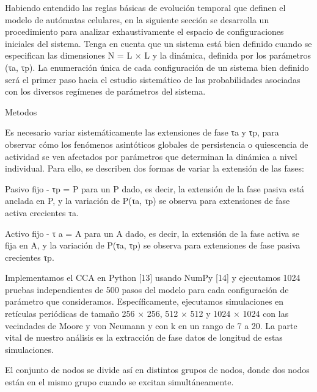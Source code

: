 Habiendo entendido las reglas básicas de evolución temporal que definen el modelo de autómatas celulares, en la siguiente sección se desarrolla un procedimiento para analizar exhaustivamente el espacio de configuraciones iniciales del sistema. Tenga en cuenta que un sistema está bien definido cuando se especifican las dimensiones N = L × L y la dinámica, definida por los parámetros (τa, τp). La enumeración única de cada configuración de un sistema bien definido será el primer paso hacia el estudio sistemático de las probabilidades asociadas con los diversos regímenes de parámetros del sistema.

Metodos

Es necesario variar sistemáticamente las extensiones de fase τa y τp, para observar cómo los fenómenos asintóticos globales de persistencia o quiescencia de actividad se ven afectados por parámetros que determinan la dinámica a nivel individual. Para ello, se describen dos formas de variar la extensión de las fases:

Pasivo fijo - τp = P para un P dado, es decir, la extensión de la fase pasiva está anclada en P, y la variación de P(τa, τp) se observa para extensiones de fase activa crecientes τa.

Activo fijo - τ a = A para un A dado, es decir, la extensión de la fase activa se fija en A, y la variación de P(τa, τp) se observa para extensiones de fase pasiva crecientes τp.


Implementamos el CCA en Python [13] usando NumPy [14] y ejecutamos 1024 pruebas independientes de 500 pasos del modelo para cada configuración de parámetro que consideramos. Específicamente, ejecutamos simulaciones en retículas periódicas de tamaño 256 × 256, 512 × 512 y 1024 × 1024 con las vecindades de Moore y von Neumann y con k en un rango de 7 a 20. La parte vital de nuestro análisis es la extracción de fase datos de longitud de estas simulaciones.

El conjunto de nodos se divide así en distintos grupos de nodos, donde dos nodos están en el mismo grupo cuando se excitan simultáneamente.




